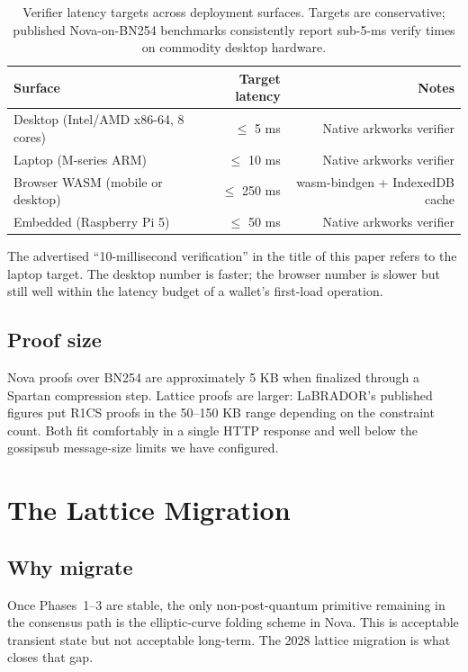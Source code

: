 \documentclass[11pt,a4paper]{article}
\begin{document}
\begin{table}[h]
\centering
\begin{tabular}{lrr}
\toprule
\textbf{Surface} & \textbf{Target latency} & \textbf{Notes} \\
\midrule
Desktop (Intel/AMD x86-64, 8 cores)  & $\le$ 5 ms   & Native arkworks verifier \\
Laptop (M-series ARM)                & $\le$ 10 ms  & Native arkworks verifier \\
Browser WASM (mobile or desktop)     & $\le$ 250 ms & wasm-bindgen + IndexedDB cache \\
Embedded (Raspberry Pi 5)            & $\le$ 50 ms  & Native arkworks verifier \\
\bottomrule
\end{tabular}
\caption{Verifier latency targets across deployment surfaces. Targets
are conservative; published Nova-on-BN254 benchmarks consistently
report sub-5-ms verify times on commodity desktop hardware.}
\label{tab:verifylatency}
\end{table}

The advertised ``10-millisecond verification'' in the title of this
paper refers to the laptop target. The desktop number is faster; the
browser number is slower but still well within the latency budget of
a wallet's first-load operation.

\subsection{Proof size}

Nova proofs over BN254 are approximately 5 KB when finalized through a
Spartan compression step. Lattice proofs are larger: LaBRADOR's
published figures put R1CS proofs in the 50--150 KB range depending on
the constraint count. Both fit comfortably in a single HTTP response
and well below the gossipsub message-size limits we have configured.

\section{The Lattice Migration}
\label{sec:lattice}

\subsection{Why migrate}

Once Phases~1--3 are stable, the only non-post-quantum primitive remaining
in the consensus path is the elliptic-curve folding scheme in Nova.
This is acceptable transient state but not acceptable long-term. The
2028 lattice migration is what closes that gap.
\end{document}
